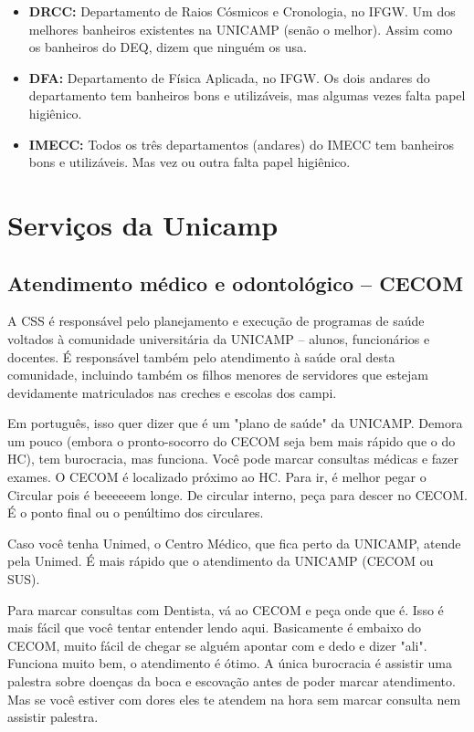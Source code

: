 \begin{itemize}
\item  \textbf{DRCC:} Departamento de Raios Cósmicos e Cronologia, no IFGW. Um dos melhores banheiros existentes na UNICAMP (senão o melhor). Assim como os banheiros do DEQ, dizem que ninguém os usa.
\end{itemize}

\begin{itemize}
\item  \textbf{DFA:} Departamento de Física Aplicada, no IFGW. Os dois andares do departamento tem banheiros bons e utilizáveis, mas algumas vezes falta papel higiênico.
\end{itemize}

\begin{itemize}
\item  \textbf{IMECC:} Todos os três departamentos (andares) do IMECC tem banheiros bons e utilizáveis. Mas vez ou outra falta papel higiênico.
\end{itemize}

\section{Serviços da Unicamp}
\subsection{Atendimento médico e odontológico -- CECOM}
A CSS é responsável pelo planejamento e execução de programas de saúde voltados
à comunidade universitária da UNICAMP -- alunos, funcionários e docentes.
É responsável também pelo atendimento à saúde oral desta comunidade, incluindo
também os filhos menores de servidores que estejam devidamente matriculados nas
creches e escolas dos campi.

Em português, isso quer dizer que é um "plano de saúde" da UNICAMP. Demora um
pouco (embora o pronto-socorro do CECOM seja bem mais rápido que o do HC), tem
burocracia, mas funciona. Você pode marcar consultas médicas e fazer exames.
O CECOM é localizado próximo ao HC. Para ir, é melhor pegar o Circular pois
é beeeeeem longe. De circular interno, peça para descer no CECOM. É o ponto
final ou o penúltimo dos circulares.

Caso você tenha Unimed, o Centro Médico, que fica perto da UNICAMP, atende pela
Unimed. É mais rápido que o atendimento da UNICAMP (CECOM ou SUS).

Para marcar consultas com Dentista, vá ao CECOM e peça onde que é. Isso é mais
fácil que você tentar entender lendo aqui. Basicamente é embaixo do CECOM, muito
fácil de chegar se alguém apontar com e dedo e dizer "ali". Funciona muito bem,
o atendimento é ótimo. A única burocracia é assistir uma palestra sobre doenças
da boca e escovação antes de poder marcar atendimento. Mas se você estiver com
dores eles te atendem na hora sem marcar consulta nem assistir palestra.

